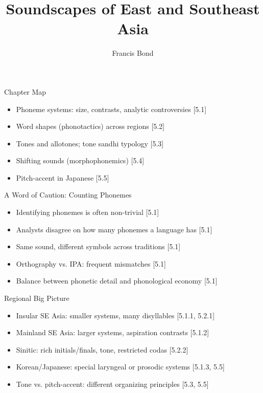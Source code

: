 \documentclass{beamer}
\title{Soundscapes of East and Southeast Asia}
\author{Francis Bond}
\date{}
\newcommand{\booksrc}[1]{\hfill {\tiny [#1]}}
\begin{document}
\frame{\titlepage}


\begin{frame}{Chapter Map}
\begin{itemize}
\item Phoneme systems: size, contrasts, analytic controversies \booksrc{5.1}
\item Word shapes (phonotactics) across regions \booksrc{5.2}
\item Tones and allotones; tone sandhi typology \booksrc{5.3}
\item Shifting sounds (morphophonemics) \booksrc{5.4}
\item Pitch-accent in Japanese \booksrc{5.5}
\end{itemize}
\end{frame}

\begin{frame}{A Word of Caution: Counting Phonemes}
\begin{itemize}
\item Identifying phonemes is often non-trivial \booksrc{5.1}
\item Analysts disagree on how many phonemes a language has \booksrc{5.1}
\item Same sound, different symbols across traditions \booksrc{5.1}
\item Orthography vs. IPA: frequent mismatches \booksrc{5.1}
\item Balance between phonetic detail and phonological economy \booksrc{5.1}
\end{itemize}
\end{frame}

\begin{frame}{Regional Big Picture}
\begin{itemize}
\item Insular SE Asia: smaller systems, many disyllables \booksrc{5.1.1, 5.2.1}
\item Mainland SE Asia: larger systems, aspiration contrasts \booksrc{5.1.2}
\item Sinitic: rich initials/finals, tone, restricted codas \booksrc{5.2.2}
\item Korean/Japanese: special laryngeal or prosodic systems \booksrc{5.1.3, 5.5}
\item Tone vs. pitch-accent: different organizing principles \booksrc{5.3, 5.5}
\end{itemize}
\end{frame}
\end{document}
